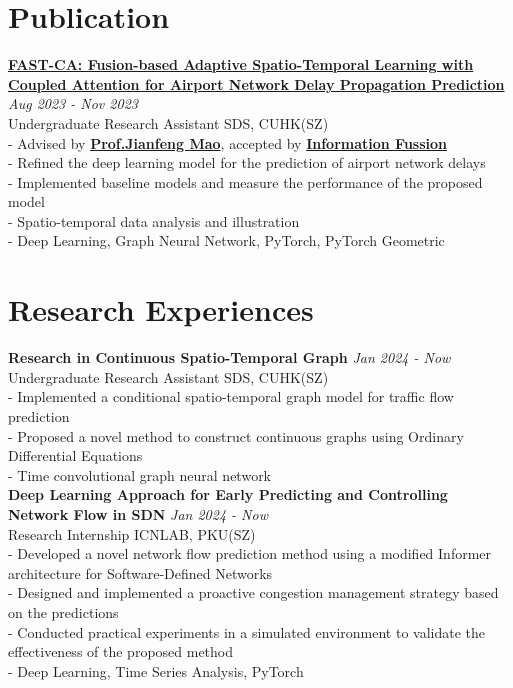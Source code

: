 \documentclass[a4paper,10pt]{article}
\begin{document}
\section*{Publication}
\textbf{\href{https://www.sciencedirect.com/science/article/pii/S1566253524001040}{FAST-CA: Fusion-based Adaptive Spatio-Temporal Learning with Coupled Attention for Airport Network Delay Propagation Prediction}} \hfill \textit{Aug 2023 - Nov 2023}\\
Undergraduate Research Assistant \hfill SDS, CUHK(SZ)\\
- Advised by \textbf{\href{https://sds.cuhk.edu.cn/en/teacher/268}{Prof.\@ Jianfeng Mao}}, accepted by  \textbf{\href{https://www.sciencedirect.com/science/article/pii/S1566253524001040}{Information Fussion}}\\
- Refined the deep learning model for the prediction of airport network delays\\
- Implemented baseline models and measure the performance of the proposed model\\
- Spatio-temporal data analysis and illustration\\
- Deep Learning, Graph Neural Network, PyTorch, PyTorch Geometric
\section*{Research Experiences}
\textbf{Research in Continuous Spatio-Temporal Graph} \hfill \textit{Jan 2024 - Now}\\
Undergraduate Research Assistant \hfill SDS, CUHK(SZ)\\
- Implemented a conditional spatio-temporal graph model for traffic flow prediction\\
- Proposed a novel method to construct continuous graphs using Ordinary Differential Equations\\
- Time convolutional graph neural network\\
\textbf{Deep Learning Approach for Early Predicting and Controlling Network Flow in SDN} \hfill \textit{Jan 2024 - Now}\\
Research Internship \hfill ICNLAB, PKU(SZ)\\
- Developed a novel network flow prediction method using a modified Informer architecture for Software-Defined Networks\\
- Designed and implemented a proactive congestion management strategy based on the predictions\\
- Conducted practical experiments in a simulated environment to validate the effectiveness of the proposed method\\
- Deep Learning, Time Series Analysis, PyTorch
\end{document}
